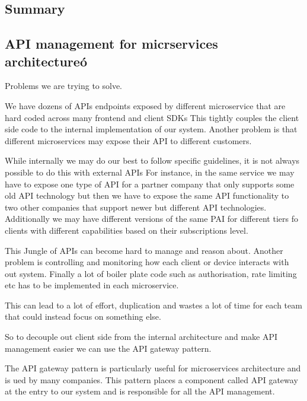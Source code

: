 \documentclass[a4paper, 11pt]{book}
\begin{document}
    \subsection{Summary}

    \subsection{API management for micrservices architectureó}
    Problems we are trying to solve.

    We have dozens of APIs endpoints exposed by different microservice that are hard coded across many frontend and client SDKs
    This tightly couples the client side code to the internal implementation of our system.
    Another problem is that different microservices may expose their API to different customers.

    While internally we may do our best to follow specific guidelines, it is not always possible to do this with external APIs
    For instance, in the same service we may have to expose one type of API for a partner company that only supports some old API technology but then we have to expose the same API functionality to two other companies that support newer but different API technologies.
    Additionally we may have different versions of the same PAI for different tiers fo clients with different capabilities based on their subscriptions level.

    This Jungle of APIs can become hard to manage and reason about.
    Another problem is controlling and monitoring how each client or device interacts with out system.
    Finally a lot of boiler plate code such as authorisation, rate limiting etc has to be implemented in each microservice.

    This can lead to a lot of effort, duplication and wastes a lot of time for each team that could instead focus on something else.

    So to decouple out client side from the internal architecture and make API management easier we can use the API gateway pattern.

    The API gateway pattern is particularly useful for microservices architecture and is ued by many companies.
    This pattern places a component called API gateway at the entry to our system and is responsible for all the API management.
\end{document}
